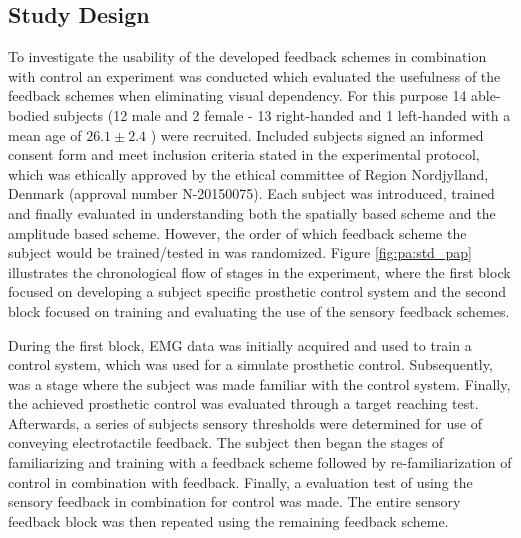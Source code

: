 \subsection{Study Design}

To investigate the usability of the developed feedback schemes in combination with control an experiment was conducted which evaluated the usefulness of the feedback schemes when eliminating visual dependency. For this purpose 14 able-bodied subjects (12 male and 2 female - 13 right-handed and 1 left-handed with a mean age of $26.1 \pm 2.4$ ) were recruited. Included subjects signed an informed consent form and meet inclusion criteria stated in the experimental protocol, which was ethically approved by the ethical committee of Region Nordjylland, Denmark (approval number N-20150075). Each subject was introduced, trained and finally evaluated in understanding both the spatially based scheme and the amplitude based scheme. However, the order of which feedback scheme the subject would be trained/tested in was randomized. Figure \ref{fig:pa:std_pap} illustrates the chronological flow of stages in the experiment, where the first block focused on developing a subject specific prosthetic control system and the second block focused on training and evaluating the use of the sensory feedback schemes. 

During the first block, EMG data was initially acquired and used to train a control system, which was used for a simulate prosthetic control. Subsequently, was a stage where the subject was made familiar with the control system. Finally, the achieved prosthetic control was evaluated through a target reaching test. Afterwards, a series of subjects sensory thresholds were determined for use of conveying electrotactile feedback. The subject then began the stages of familiarizing and training with a feedback scheme followed by re-familiarization of control in combination with feedback. Finally, a evaluation test of using the sensory feedback in combination for control was made. The entire sensory feedback block was then repeated using the remaining feedback scheme. 

